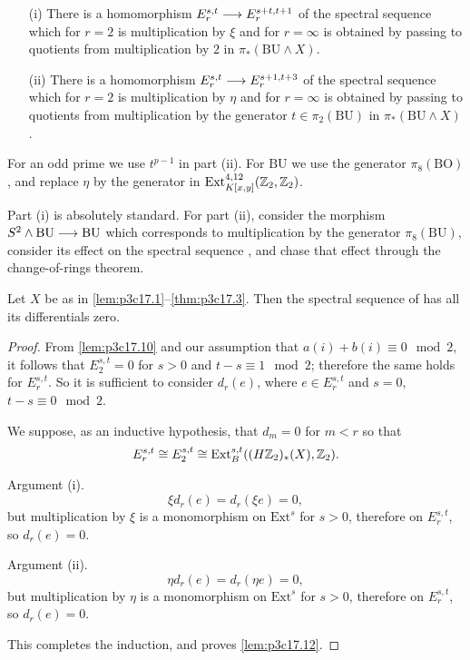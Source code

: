 \documentclass[../main]{subfiles}
\begin{document}
\begin{lemma}
\label{lem:p3c17.11}
\begin{enumerate}
    \item[(i)] There is a homomorphism $E_r^{s, t} \overset{}{\longrightarrow} E_r^{s + t, t + 1}$ of the spectral sequence  which for $r = 2$ is multiplication by $\xi$ and for $r = \infty$ is obtained by passing to quotients from multiplication by $2$ in $\pi_\ast(\mathrm{BU} \wedge X)$.
    \item[(ii)] There is a homomorphism $E_r^{s, t} \overset{}{\longrightarrow} E_r^{s + 1, t + 3}$ of the spectral sequence  which for $r = 2$ is multiplication by $\eta$ and for $r = \infty$ is obtained by passing to quotients from multiplication by the generator $t \in \pi_2(\mathrm{BU})$ in $\pi_\ast(\mathrm{BU} \wedge X)$.
\end{enumerate}
\end{lemma}

For an odd prime we use $t^{p - 1}$ in part (ii). For $\mathrm{BU}$ we use the generator $\pi_8(\mathrm{BO})$, and replace $\eta$ by the generator in $\mathrm{Ext}_{K[x, y]}^{4, 12}(\mathbb{Z}_2, \mathbb{Z}_2)$. 

Part (i) is absolutely standard. For part (ii), consider the morphism $S^2 \wedge \mathrm{BU} \overset{}{\longrightarrow} \mathrm{BU}$ which corresponds to multiplication by the generator $\pi_8(\mathrm{BU})$, consider its effect on the spectral sequence , and chase that effect through the change-of-rings theorem.

\begin{lemma}
\label{lem:p3c17.12} 
Let $X$ be as in \ref{lem:p3c17.1}--\ref{thm:p3c17.3}. Then the spectral sequence of  has all its differentials zero. 
\end{lemma}

\begin{proof}
From \ref{lem:p3c17.10} and our assumption that $a(i) + b(i) \equiv 0 \mod 2$, it follows that $E_2^{s, t} = 0$ for $s > 0$ and $t - s \equiv 1 \mod 2$; therefore the same holds for $E_r^{s, t}$. So it is sufficient to consider $d_r(e)$, where $e \in E_r^{s, t}$ and $s = 0$, $t - s \equiv 0 \mod 2$. 

We suppose, as an inductive hypothesis, that $d_m = 0$ for $m < r$ so that $$E_r^{s, t} \cong E_2^{s, t} \cong \mathrm{Ext}_B^{s, t} ((H \mathbb{Z}_2)_\ast(X), \mathbb{Z}_2).$$

Argument (i). $$\xi d_r(e) = d_r(\xi e) = 0,$$ but multiplication by $\xi$ is a monomorphism on $\mathrm{Ext}^s$ for $s > 0$, therefore on $E_r^{s, t}$, so $d_r(e) = 0$.

Argument (ii). $$\eta d_r(e) = d_r(\eta e) = 0,$$ but multiplication by $\eta$ is a monomorphism on $\mathrm{Ext}^s$ for $s > 0$, therefore on $E_r^{s, t}$, so $d_r(e) = 0$.

This completes the induction, and proves \ref{lem:p3c17.12}. 
\end{proof}
\end{document}
